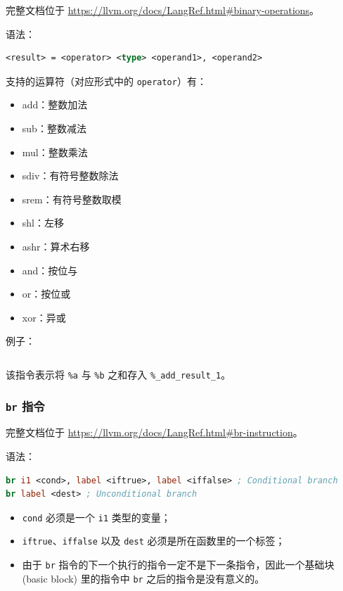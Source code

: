 \begin{remark}
完整文档位于 \url{https://llvm.org/docs/LangRef.html\#binary-operations}。
\end{remark}

语法：
\begin{lstlisting}[language=llvm]
<result> = <operator> <type> <operand1>, <operand2>
\end{lstlisting}

支持的运算符（对应形式中的 \texttt{operator}）有：
\begin{itemize}
  \item add：整数加法
  \item sub：整数减法
  \item mul：整数乘法
  \item sdiv：有符号整数除法
  \item srem：有符号整数取模
  \item shl：左移
  \item ashr：算术右移
  \item and：按位与
  \item or：按位或
  \item xor：异或
\end{itemize}

例子：
\begin{lstlisting}[language=llvm]
%_add_result_1 = add i32 %a, %b
\end{lstlisting}

该指令表示将 \texttt{\%a} 与 \texttt{\%b} 之和存入 \texttt{\%\_add\_result\_1}。

\subsubsection{\texttt{br} 指令}\label{LLVM-br-instructions}

\begin{remark}
完整文档位于 \url{https://llvm.org/docs/LangRef.html\#br-instruction}。
\end{remark}

语法：
\begin{lstlisting}[language=llvm]
br i1 <cond>, label <iftrue>, label <iffalse> ; Conditional branch
br label <dest> ; Unconditional branch
\end{lstlisting}

\begin{itemize}
  \item \texttt{cond} 必须是一个 \texttt{i1} 类型的变量；
  \item \texttt{iftrue}、\texttt{iffalse} 以及 \texttt{dest}
    必须是所在函数里的一个标签；
  \item 由于 \texttt{br} 指令的下一个执行的指令一定不是下一条指令，因此一个基础块
    (basic block) 里的指令中 \texttt{br} 之后的指令是没有意义的。
\end{itemize}

